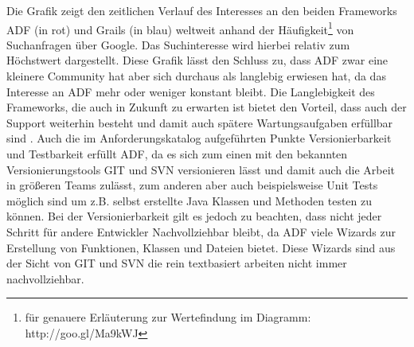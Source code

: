 Die Grafik zeigt den zeitlichen Verlauf des Interesses an den beiden Frameworks ADF (in rot) und Grails (in blau) weltweit anhand der Häufigkeit\footnote{für genauere Erläuterung zur Wertefindung im Diagramm: http://goo.gl/Ma9kWJ} von Suchanfragen über Google. Das Suchinteresse wird hierbei relativ zum Höchstwert dargestellt. Diese Grafik lässt den Schluss zu, dass ADF zwar eine kleinere Community hat aber sich durchaus als langlebig erwiesen hat, da das Interesse an ADF mehr oder weniger konstant bleibt. Die Langlebigkeit des Frameworks, die auch in Zukunft zu erwarten ist bietet den Vorteil, dass auch der Support weiterhin besteht und damit auch spätere Wartungsaufgaben erfüllbar sind \citep[S.214]{EFCMW2013}. Auch die im Anforderungskatalog aufgeführten Punkte Versionierbarkeit und Testbarkeit erfüllt ADF, da es sich zum einen mit den bekannten Versionierungstools GIT und SVN versionieren lässt und damit auch die Arbeit in größeren Teams zulässt, zum anderen aber auch beispielsweise Unit Tests möglich sind um z.B. selbst erstellte Java Klassen und Methoden testen zu können. Bei der Versionierbarkeit gilt es jedoch zu beachten, dass nicht jeder Schritt für andere Entwickler Nachvollziehbar bleibt, da ADF viele Wizards zur Erstellung von Funktionen, Klassen und Dateien bietet. Diese Wizards sind aus der Sicht von GIT und SVN die rein textbasiert arbeiten nicht immer nachvollziehbar.

